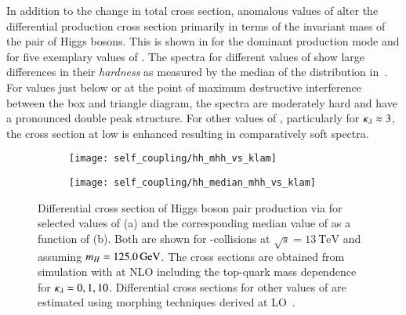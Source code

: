 In addition to the change in total cross section, anomalous values of
\klambda alter the differential \HH production cross section primarily
in terms of the invariant mass of the pair of Higgs bosons. This is
shown in  for the dominant \ggF production mode
and for five exemplary values of \klambda. The \mHH spectra for
different values of \klambda show large differences in their
\emph{hardness} as measured by the median of the \mHH distribution
in~. For \klambda values just below or at the
point of maximum destructive interference between the box and triangle
diagram, the \mHH spectra are moderately hard and have a pronounced
double peak structure. For other values of \klambda, particularly for
$\kappa_{\lambda} \approx 3$, the cross section at low \mHH is enhanced
resulting in comparatively soft \mHH spectra.

\begin{figure}[htbp]
  \begin{subfigure}[t]{0.485\textwidth}
    \texttt{[image: self\_coupling/hh\_mhh\_vs\_klam]}
    \label{fig:hh_xsec_mhh}
  \end{subfigure}\hfill%
  \begin{subfigure}[t]{0.485\textwidth}
    \texttt{[image: self\_coupling/hh\_median\_mhh\_vs\_klam]}
    \label{fig:hh_median_mhh}
  \end{subfigure}

  \caption{Differential cross section of Higgs boson pair production
    via \ggF for selected values of \klambda (a) and the corresponding
    median value of \mHH as a function of \klambda (b). Both are shown
    for \pp-collisions at $\sqrt{s} = \SI{13}{\TeV}$ and assuming
    $m_{H}= \SI{125.0}{\ensuremath{\text{GeV}}}$. The cross sections are obtained from
    simulation with \POWHEGBOX[v2] at NLO including the top-quark mass
    dependence~\cite{Heinrich:2019bkc,Heinrich:2020ckp} for
    $\kappa_{\lambda} = 0, 1, 10$. Differential cross sections for other
    values of \klambda are estimated using morphing techniques derived
    at LO~\cite{ATL-PHYS-PUB-2019-007}.}
\end{figure}

